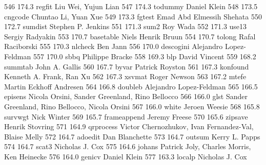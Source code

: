    546    174.3    regfit        Liu Wei, Yujun Lian                     
   547    174.3    todummy       Daniel Klein                            
   548    173.5    cngcode       Chuntao Li, Yuan Xue                    
   549    173.3    fgtest        Emad Abd Elmessih Shehata               
   550    172.7    sumdist       Stephen P. Jenkins                      
   551    171.3    sum2          Roy Wada                                
   552    171.3    use13         Sergiy Radyakin                         
   553    170.7    basetable     Niels Henrik Bruun                      
   554    170.7    tolong        Rafal Raciborski                        
   555    170.3    nlcheck       Ben Jann                                
   556    170.0    descogini     Alejandro Lopez-Feldman                 
   557    170.0    sbbq          Philippe Bracke                         
   558    169.3    blp           David Vincent                           
   559    168.2    summtab       John A. Gallis                          
   560    167.7    byvar         Patrick Royston                         
   561    167.3    konfound      Kenneth A. Frank, Ran Xu                
   562    167.3    xsvmat        Roger Newson                            
   563    167.2    mtefe         Martin Eckhoff Andresen                 
   564    166.8    doubleb       Alejandro Lopez-Feldman                 
   565    166.5    episens       Nicola Orsini, Sander Greenland, Rino   
                                   Bellocco                                
   566    166.0    glst          Sander Greenland, Rino Bellocco, Nicola 
                                   Orsini                                  
   567    166.0    white         Jeroen Weesie                           
   568    165.8    survwgt       Nick Winter                             
   569    165.7    frameappend   Jeremy Freese                           
   570    165.6    zipsave       Henrik Stovring                         
   571    164.9    qrprocess     Victor Chernozhukov, Ivan               
                                   Fernandez-Val, Blaise Melly             
   572    164.7    adoedit       Dan Blanchette                          
   573    164.7    outsum        Kerry L. Papps                          
   574    164.7    scat3         Nicholas J. Cox                         
   575    164.6    johans        Patrick Joly, Charles Morris, Ken       
                                   Heinecke                                
   576    164.0    genicv        Daniel Klein                            
   577    163.3    localp        Nicholas J. Cox                         
